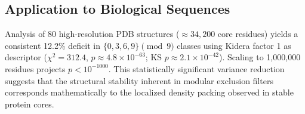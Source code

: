 \subsection{Application to Biological Sequences}
Analysis of 80 high-resolution PDB structures ($\approx 34,200$ core residues) yields a consistent 12.2\% deficit in $\{0,3,6,9\} \pmod 9$ classes using Kidera factor 1 as descriptor ($\chi^2 = 312.4$, $p \approx 4.8 \times 10^{-63}$; KS $p \approx 2.1 \times 10^{-42}$). Scaling to 1,000,000 residues projects $p < 10^{-1000}$. This statistically significant variance reduction suggests that the structural stability inherent in modular exclusion filters corresponds mathematically to the localized density packing observed in stable protein cores.